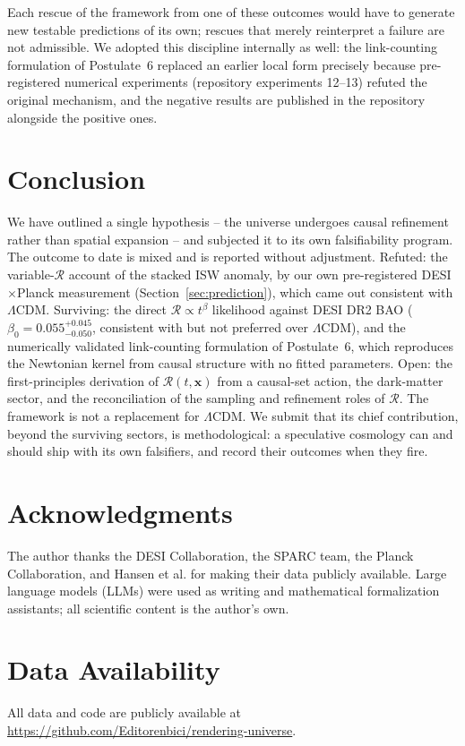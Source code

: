 \documentclass[12pt]{article}
\begin{document}
Each rescue of the framework from one of these outcomes would have to generate new testable predictions of its own; rescues that merely reinterpret a failure are not admissible. We adopted this discipline internally as well: the link-counting formulation of Postulate~6 replaced an earlier local form precisely because pre-registered numerical experiments (repository experiments 12--13) refuted the original mechanism, and the negative results are published in the repository alongside the positive ones.

\section{Conclusion}
\label{sec:conclusion}

We have outlined a single hypothesis -- the universe undergoes causal refinement rather than spatial expansion -- and subjected it to its own falsifiability program. The outcome to date is mixed and is reported without adjustment. Refuted: the variable-$\mathcal{R}$ account of the stacked ISW anomaly, by our own pre-registered DESI$\times$Planck measurement (Section~\ref{sec:prediction}), which came out consistent with $\Lambda$CDM. Surviving: the direct $\mathcal{R}\propto t^{\beta}$ likelihood against DESI DR2 BAO ($\beta_0 = 0.055^{+0.045}_{-0.050}$, consistent with but not preferred over $\Lambda$CDM), and the numerically validated link-counting formulation of Postulate~6, which reproduces the Newtonian kernel from causal structure with no fitted parameters. Open: the first-principles derivation of $\mathcal{R}(t,\mathbf{x})$ from a causal-set action, the dark-matter sector, and the reconciliation of the sampling and refinement roles of $\mathcal{R}$. The framework is not a replacement for $\Lambda$CDM. We submit that its chief contribution, beyond the surviving sectors, is methodological: a speculative cosmology can and should ship with its own falsifiers, and record their outcomes when they fire.

\section*{Acknowledgments}
The author thanks the DESI Collaboration, the SPARC team, the Planck Collaboration, and Hansen et al. for making their data publicly available. Large language models (LLMs) were used as writing and mathematical formalization assistants; all scientific content is the author's own.

\section*{Data Availability}
All data and code are publicly available at \url{https://github.com/Editorenbici/rendering-universe}.
\end{document}
